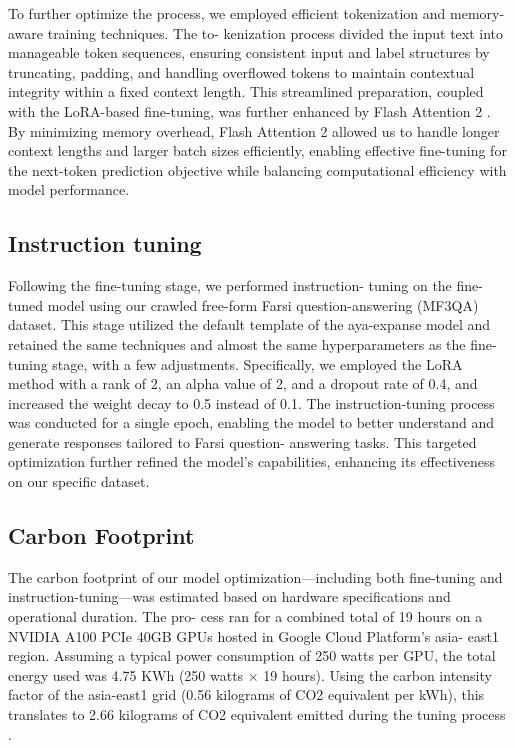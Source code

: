 \documentclass[conference]{IEEEtran}
\begin{document}
	To further optimize the process, we employed efficient
	tokenization and memory-aware training techniques. The to-
	kenization process divided the input text into manageable
	token sequences, ensuring consistent input and label structures
	by truncating, padding, and handling overflowed tokens to
	maintain contextual integrity within a fixed context length.
	This streamlined preparation, coupled with the LoRA-based
	fine-tuning, was further enhanced by Flash Attention 2 
	\cite{b28}.
	By minimizing memory overhead, Flash Attention 2 allowed
	us to handle longer context lengths and larger batch sizes
	efficiently, enabling effective fine-tuning for the next-token
	prediction objective while balancing computational efficiency
	with model performance.
	\subsection{Instruction tuning}
	Following the fine-tuning stage, we performed instruction-
	tuning on the fine-tuned model using our crawled free-form
	Farsi question-answering (MF3QA) dataset. This stage utilized
	the default template of the aya-expanse model and retained
	the same techniques and almost the same hyperparameters as
	the fine-tuning stage, with a few adjustments. Specifically, we
	employed the LoRA method with a rank of 2, an alpha value
	of 2, and a dropout rate of 0.4, and increased the weight
	decay to 0.5 instead of 0.1. The instruction-tuning process
	was conducted for a single epoch, enabling the model to better
	understand and generate responses tailored to Farsi question-
	answering tasks. This targeted optimization further refined the
	model’s capabilities, enhancing its effectiveness on our specific
	dataset.
	\subsection{Carbon Footprint}
	The carbon footprint of our model optimization—including
	both fine-tuning and instruction-tuning—was estimated based
	on hardware specifications and operational duration. The pro-
	cess ran for a combined total of 19 hours on a NVIDIA A100
	PCIe 40GB GPUs hosted in Google Cloud Platform’s asia-
	east1 region. Assuming a typical power consumption of 250
	watts per GPU, the total energy used was 4.75 KWh (250
	watts × 19 hours). Using the carbon intensity factor of the
	asia-east1 grid (0.56 kilograms of CO2 equivalent per kWh),
	this translates to 2.66 kilograms of CO2 equivalent emitted
	during the tuning process
	\cite{b29}.
\end{document}
